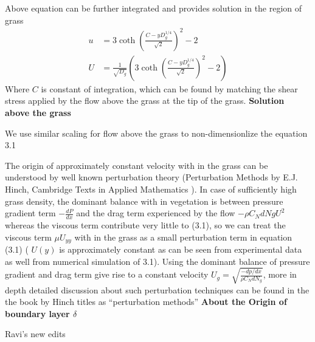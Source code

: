 \documentclass[letterpaper,10pt]{article}
\begin{document}
Above equation can be further integrated and provides solution in the region of grass
\begin{equation}
\begin{split}
u &= 3 \coth \left(\frac{C-y D_g^{1/4}}{\sqrt{2}}  \right)^2-2 \\
U &= \frac{1}{\sqrt{D_g}} \left( 3 \coth \left(\frac{C-y D_g^{1/4}}{\sqrt{2}}  \right)^2-2    \right)
\end{split}
\end{equation}
Where $C$ is constant of integration, which can be found by matching the shear stress applied by the flow above the grass at the tip of the grass.
\textbf{Solution above the grass}

We use similar scaling for flow above the grass to non-dimensionlize the equation 3.1 
\begin{equation}
 
\end{equation}



The origin of approximately constant velocity with in the grass 
can be understood by well known perturbation theory (Perturbation Methods by E.J. Hinch, Cambridge Texts in Applied Mathematics ). In case of sufficiently high grass density, the dominant balance
with in vegetation is between pressure gradient term $-\frac{dP}{dx}$ and the drag term experienced by the flow $-\rho C_N dNg U^2$ whereas the viscous term contribute very little 
to (3.1), so we can treat the viscous term $\mu U_{yy}$ with in the grass as a small perturbation term in equation (3.1) ( $U(y)$ is approximately constant as can be seen from experimental data as well from
numerical simulation of 3.1). Using the dominant balance of pressure gradient and drag term 
give rise to a constant velocity $U_g = \sqrt{\frac{-dp/dx}{\rho C_N d N_g}}$, more in depth detailed discussion about such perturbation techniques can be found in the the book by Hinch titles as ``perturbation
methods''
\newline
\textbf{ About the Origin of boundary layer $\delta$}

\centerline{Ravi's new edits}
\end{document}
